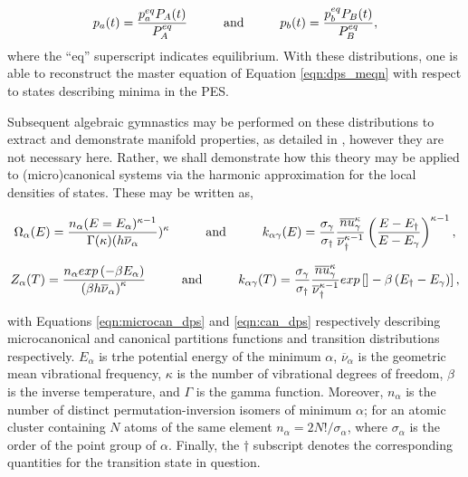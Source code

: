 \begin{equation}
    p_{a}(t) = \frac{p_{a}^{eq}P_{A}(t)}{P_{A}^{eq}} \hspace{1.0cm} \text{and} \hspace{1.0cm} p_{b}(t) = \frac{p_{b}^{eq}P_{B}(t)}{P_{B}^{eq}} ,
    \label{eqn:occ_prob_dps_equ}
\end{equation}
 where the ``eq'' superscript indicates equilibrium. With these distributions, one is able to reconstruct the master equation of Equation \ref{eqn:dps_meqn} with respect to states describing minima in the PES. 

 Subsequent algebraic gymnastics may be performed on these distributions to extract and demonstrate manifold properties, as detailed in \cite{doi:10.1080/00268970210162691}, however they are not necessary here. Rather, we shall demonstrate how this theory may be applied to (micro)canonical systems via the harmonic approximation for the local densities of states. These may be written as,

 \begin{equation}
     \Omega_{\alpha}(E) = \frac{ n_{\alpha}(E = E_{\alpha})^{\kappa - 1} } { \Gamma(\kappa) (h\overline{\nu}_{\alpha} })^{\kappa} \hspace{1.0cm} \text{and} \hspace{1.0cm} k_{\alpha\gamma}(E) = \frac{\sigma_{\gamma}}{\sigma_{\dagger}} \frac{  \overline{nu}_{\gamma}^{\kappa} } { \overline{\nu}_{\dagger}^{\kappa -1} } \left( \frac{ E-E_{\dagger} }{ E-E_{\gamma} } \right)^{\kappa - 1},
     \label{eqn:microcan_dps}
 \end{equation}

 \begin{equation}
     Z_{\alpha}(T) = \frac{ n_{\alpha} exp\left( -\beta E_{\alpha} \right) } { \left(\beta h \overline{\nu}_{\alpha} \right)^{\kappa} } \hspace{1.0cm} \text{and} \hspace{1.0cm} k_{\alpha\gamma}(T) =  \frac{\sigma_{\gamma}}{\sigma_{\dagger}} \frac{  \overline{nu}_{\gamma}^{\kappa} } { \overline{\nu}_{\dagger}^{\kappa -1} } exp\left[] -\beta \left( E_{\dagger} - E_{\gamma} \right) \right],
     \label{eqn:can_dps}
 \end{equation}

with Equations \ref{eqn:microcan_dps} and \ref{eqn:can_dps} respectively describing microcanonical and canonical partitions functions and transition distributions respectively. $E_{\alpha}$ is trhe potential energy of the minimum $\alpha$, $\overline{\nu}_{\alpha}$ is the geometric mean vibrational frequency, $\kappa$ is the number of vibrational degrees of freedom, $\beta$ is the inverse temperature, and $\Gamma$ is the gamma function. Moreover, $n_{\alpha}$ is the number of distinct permutation-inversion isomers of minimum $\alpha$; for an atomic cluster containing $N$ atoms of the same element $n_{\alpha} = 2N!/\sigma_{\alpha}$, where $\sigma_{\alpha}$ is the order of the point group of $\alpha$. Finally, the $\dagger$ subscript denotes the corresponding quantities for the transition state in question.

